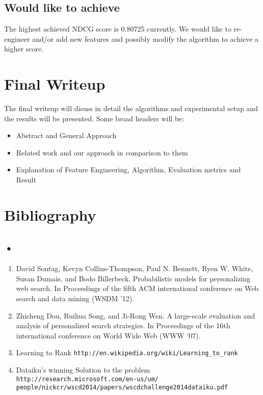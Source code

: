 \documentclass[11pt]{article}
\begin{document}
\subsection{Would like to achieve}
The highest achieved NDCG score is 0.80725 currently. We would like to re-engineer and/or add new features and possibly modify the algorithm to achieve a higher score.
\section{Final Writeup} The final writeup will disuss in detail the algorithms and experimental setup and the results will be presented. Some broad headers will be:\\
\vspace{-5mm} 
\begin{itemize}\setlength{\itemsep}{-5pt}
\item Abstract and General Approach
\item Related work and our approach in comparison to them
\item Explanation of Feature Engineering, Algorithm, Evaluation metrics and Result  
\end{itemize}
\noindent
\section{Bibliography}
\subsection*{•}
\vspace{-5mm}
\begin{enumerate}\setlength{\itemsep}{-5pt}
\item David Sontag, Kevyn Collins-Thompson, Paul N. Bennett, Ryen W. White, Susan Dumais, and Bodo Billerbeck. Probabilistic models for personalizing web search. In Proceedings of the fifth ACM international conference on Web search and data mining (WSDM '12).
\item Zhicheng Dou, Ruihua Song, and Ji-Rong Wen.  A large-scale evaluation and analysis of personalized search strategies. In Proceedings of the 16th international conference on World Wide Web (WWW '07).
\item Learning to Rank \texttt{http://en.wikipedia.org/wiki/Learning\_to\_rank}
\item Dataiku's winning Solution to the problem \texttt{http://research.microsoft.com/en-us/um/ \\ people/nickcr/wscd2014/papers/wscdchallenge2014dataiku.pdf}

\end{enumerate}
\end{document}
